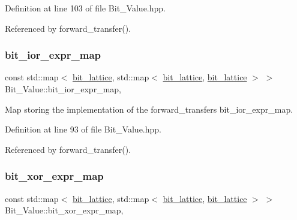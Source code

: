 Definition at line 103 of file Bit\+\_\+\+Value.\+hpp.



Referenced by forward\+\_\+transfer().

\mbox{\label{classBit__Value_a64fd76ea6cbb0dccb62dd90302d5122d}} 
\subsubsection{\texorpdfstring{bit\+\_\+ior\+\_\+expr\+\_\+map}{bit\_ior\_expr\_map}}
{\footnotesize\ttfamily const std\+::map$<$ \hyperlink{bit__lattice_8hpp_ab732360111c810c4eaeb4c8b81d160d6}{bit\+\_\+lattice}, std\+::map$<$ \hyperlink{bit__lattice_8hpp_ab732360111c810c4eaeb4c8b81d160d6}{bit\+\_\+lattice}, \hyperlink{bit__lattice_8hpp_ab732360111c810c4eaeb4c8b81d160d6}{bit\+\_\+lattice} $>$ $>$ Bit\+\_\+\+Value\+::bit\+\_\+ior\+\_\+expr\+\_\+map\hspace{0.3cm}{\ttfamily [static]}, {\ttfamily [private]}}



Map storing the implementation of the forward\+\_\+transfer\textquotesingle{}s bit\+\_\+ior\+\_\+expr\+\_\+map. 



Definition at line 93 of file Bit\+\_\+\+Value.\+hpp.



Referenced by forward\+\_\+transfer().

\mbox{\label{classBit__Value_aa5fbce787906cfea58af464a5db01721}} 
\subsubsection{\texorpdfstring{bit\+\_\+xor\+\_\+expr\+\_\+map}{bit\_xor\_expr\_map}}
{\footnotesize\ttfamily const std\+::map$<$ \hyperlink{bit__lattice_8hpp_ab732360111c810c4eaeb4c8b81d160d6}{bit\+\_\+lattice}, std\+::map$<$ \hyperlink{bit__lattice_8hpp_ab732360111c810c4eaeb4c8b81d160d6}{bit\+\_\+lattice}, \hyperlink{bit__lattice_8hpp_ab732360111c810c4eaeb4c8b81d160d6}{bit\+\_\+lattice} $>$ $>$ Bit\+\_\+\+Value\+::bit\+\_\+xor\+\_\+expr\+\_\+map\hspace{0.3cm}{\ttfamily [static]}, {\ttfamily [private]}}



